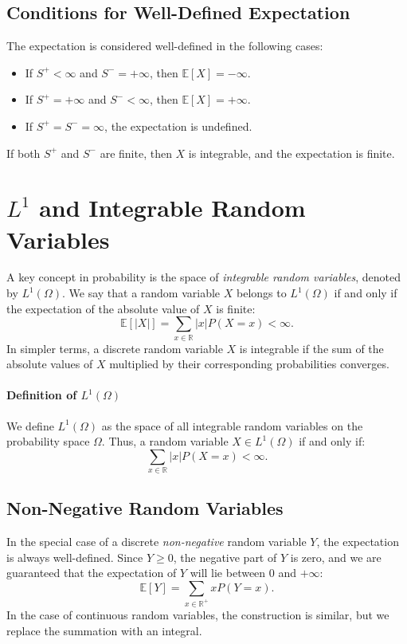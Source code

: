     \subsection{Conditions for Well-Defined Expectation}
    The expectation is considered well-defined in the following cases:
    \begin{itemize}
        \item If $S^+ < \infty$ and $S^- = +\infty$, then $\mathbb{E}[X] = -\infty$.
        \item If $S^+ = +\infty$ and $S^- < \infty$, then $\mathbb{E}[X] = +\infty$.
        \item If $S^+ = S^- = \infty$, the expectation is undefined.
    \end{itemize}
    If both $S^+$ and $S^-$ are finite, then $X$ is integrable, and the expectation is finite.
    
    \section{$L^1$ and Integrable Random Variables}
    A key concept in probability is the space of \textit{integrable random variables}, denoted by $L^1(\Omega)$. We say that a random variable $X$ belongs to $L^1(\Omega)$ if and only if the expectation of the absolute value of $X$ is finite:
    \[
    \mathbb{E}[|X|] = \sum_{x \in \mathbb{R}} |x| P(X = x) < \infty.
    \]
    In simpler terms, a discrete random variable $X$ is integrable if the sum of the absolute values of $X$ multiplied by their corresponding probabilities converges.
    
    \paragraph{Definition of $L^1(\Omega)$}
    We define $L^1(\Omega)$ as the space of all integrable random variables on the probability space $\Omega$. Thus, a random variable $X \in L^1(\Omega)$ if and only if:
    \[
    \sum_{x \in \mathbb{R}} |x| P(X = x) < \infty.
    \]
    
    \subsection{Non-Negative Random Variables}
    In the special case of a discrete \textit{non-negative} random variable $Y$, the expectation is always well-defined. Since $Y \geq 0$, the negative part of $Y$ is zero, and we are guaranteed that the expectation of $Y$ will lie between 0 and $+\infty$:
    \[
    \mathbb{E}[Y] = \sum_{x \in \mathbb{R}^+} x P(Y = x).
    \]
    In the case of continuous random variables, the construction is similar, but we replace the summation with an integral.
    
